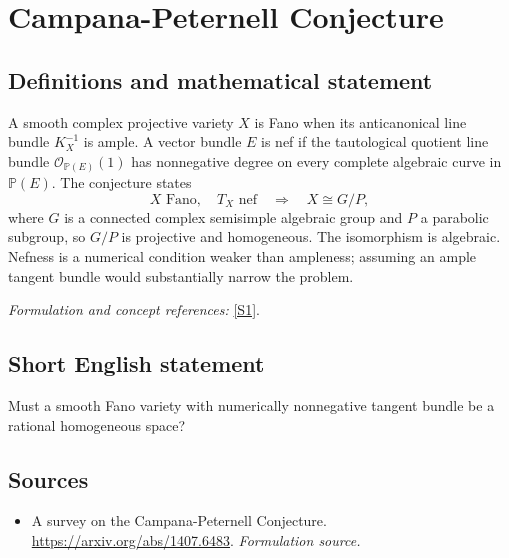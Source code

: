 \documentclass[11pt]{article}
\begin{document}
\section*{\texorpdfstring{Campana-Peternell Conjecture}{Campana-Peternell Conjecture}}\label{468}
\subsection{Definitions and mathematical statement}
A smooth complex projective variety $X$ is Fano when its anticanonical line bundle $K_X^{-1}$ is ample. A vector bundle $E$ is nef if the tautological quotient line bundle $\mathcal O_{{\mathbb{P}}(E)}(1)$ has nonnegative degree on every complete algebraic curve in ${\mathbb{P}}(E)$. The conjecture states
\[
 X\text{ Fano},\quad T_X\text{ nef}
 \quad\Longrightarrow\quad X\cong G/P,
\]
where $G$ is a connected complex semisimple algebraic group and $P$ a parabolic subgroup, so $G/P$ is projective and homogeneous. The isomorphism is algebraic. Nefness is a numerical condition weaker than ampleness; assuming an ample tangent bundle would substantially narrow the problem.
\par\smallskip\textit{Formulation and concept references:} \href{https://arxiv.org/abs/1407.6483}{[S1]}.

\subsection{Short English statement}
Must a smooth Fano variety with numerically nonnegative tangent bundle be a rational homogeneous space?
\subsection{Sources}
\begin{itemize}
\item[S1]A survey on the Campana-Peternell Conjecture.
\url{https://arxiv.org/abs/1407.6483}.
\textit{Formulation source.}
\end{itemize}
\end{document}
